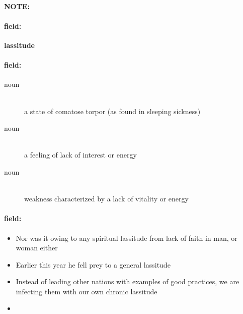 \documentclass[12pt]{article}
\newenvironment{note}{\paragraph{NOTE:}}{}
\newenvironment{field}{\paragraph{field:}}{}
\begin{document}
\begin{note}
\begin{field}
\textbf{\large lassitude}
\end{field}


\begin{field}
\begin{description}
\item[noun] \hfill \\ 
a state of comatose torpor (as found in sleeping sickness)

\item[noun] \hfill \\ 
a feeling of lack of interest or energy

\item[noun] \hfill \\ 
weakness characterized by a lack of vitality or energy

\end{description}
\end{field}

\begin{field}
\begin{itemize}
\item Nor was it owing to any spiritual lassitude from lack of faith in man, or woman either
\item Earlier this year he fell prey to a general lassitude
\item Instead of leading other nations with examples of good practices, we are infecting them with our own chronic lassitude
\item 
\end{itemize}
\end{field}
\end{note}
\end{document}
